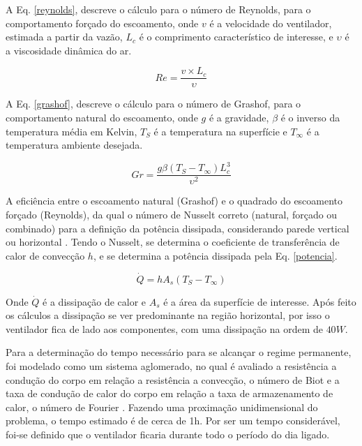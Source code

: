 A Eq. \ref{reynolds}, descreve o cálculo para o número de Reynolds, para o comportamento forçado do escoamento, onde $v$ é a velocidade do ventilador, estimada a partir da vazão, $L_c$ é o comprimento característico de interesse, e $\upsilon$ é a viscosidade dinâmica do ar.

\begin{equation}
	Re= \frac{v \times L_c}{\upsilon}
	\label{reynolds}
\end{equation}

A Eq. \ref{grashof}, descreve o cálculo para o número de Grashof, para o comportamento natural do escoamento, onde $g$ é a gravidade, $\beta$ é o inverso da temperatura média em Kelvin, $T_S$ é a temperatura na superfície e $T_{\infty}$ é a temperatura ambiente desejada.

\begin{equation}
	Gr= \frac{g \beta (T_S-T_{\infty})L_c^3}{\upsilon^2}
	\label{grashof}
\end{equation}

A eficiência entre o escoamento natural (Grashof) e o quadrado do escoamento forçado (Reynolds), da qual o número de Nusselt correto (natural, forçado ou combinado) para a definição da potência dissipada, considerando parede vertical ou horizontal \cite{livro_transcal}. Tendo o Nusselt, se determina o coeficiente de transferência de calor de convecção $h$, e se determina a potência dissipada pela Eq. \ref{potencia}.

\begin{equation}
	\dot{Q}= hA_s(T_S-T_{\infty})
	\label{potencia}
\end{equation}

Onde $\dot{Q}$ é a dissipação de calor e $A_s$ é a área da superfície de interesse. Após feito os cálculos a dissipação se ver predominante na região horizontal, por isso o ventilador fica de lado aos componentes, com uma dissipação na ordem de $40W$.

Para a determinação do tempo necessário para se alcançar o regime permanente, foi modelado como um sistema aglomerado, no qual é avaliado a resistência a condução do corpo em relação a resistência a convecção, o número de Biot e a taxa de condução de calor do corpo em relação a taxa de armazenamento de calor, o número de Fourier \cite{livro_transcal}. Fazendo uma proximação unidimensional do problema, o tempo estimado é de cerca de 1h. Por ser um tempo considerável, foi-se definido que o ventilador ficaria durante todo o período do dia ligado.



